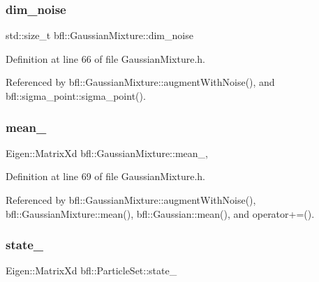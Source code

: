 \subsubsection{\texorpdfstring{dim\+\_\+noise}{dim\_noise}}
{\footnotesize\ttfamily std\+::size\+\_\+t bfl\+::\+Gaussian\+Mixture\+::dim\+\_\+noise\hspace{0.3cm}{\ttfamily [inherited]}}



Definition at line 66 of file Gaussian\+Mixture.\+h.



Referenced by bfl\+::\+Gaussian\+Mixture\+::augment\+With\+Noise(), and bfl\+::sigma\+\_\+point\+::sigma\+\_\+point().

\mbox{\label{classbfl_1_1GaussianMixture_a12a1175e838a753129f4cc133b2c1a9c}} 
\subsubsection{\texorpdfstring{mean\+\_\+}{mean\_}}
{\footnotesize\ttfamily Eigen\+::\+Matrix\+Xd bfl\+::\+Gaussian\+Mixture\+::mean\+\_\+\hspace{0.3cm}{\ttfamily [protected]}, {\ttfamily [inherited]}}



Definition at line 69 of file Gaussian\+Mixture.\+h.



Referenced by bfl\+::\+Gaussian\+Mixture\+::augment\+With\+Noise(), bfl\+::\+Gaussian\+Mixture\+::mean(), bfl\+::\+Gaussian\+::mean(), and operator+=().

\mbox{\label{classbfl_1_1ParticleSet_aa22f8487821f64e1428e37a82752c28e}} 
\subsubsection{\texorpdfstring{state\+\_\+}{state\_}}
{\footnotesize\ttfamily Eigen\+::\+Matrix\+Xd bfl\+::\+Particle\+Set\+::state\+\_\+\hspace{0.3cm}{\ttfamily [protected]}}



